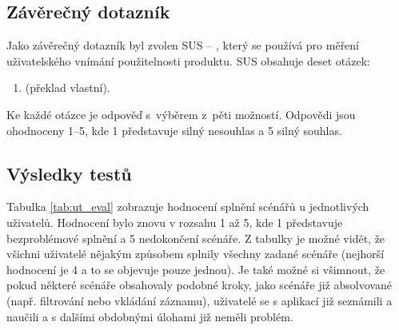 \documentclass[thesis=M,czech]{FITthesis}[2012/06/26]
\begin{document}
\subsection{Závěrečný dotazník}
Jako závěrečný dotazník byl zvolen SUS -- , který se používá pro měření uživatelského vnímání použitelnosti produktu. SUS obsahuje deset otázek:
\begin{enumerate}
 \item {} (překlad vlastní).
\end{enumerate}
Ke každé otázce je odpověď s~výběrem z~pěti možností. Odpovědi jsou ohodnoceny 1--5, kde 1 představuje silný nesouhlas a 5 silný souhlas. \cite{sus}

\subsection{Výsledky testů}
Tabulka \ref{tab:ut_eval} zobrazuje hodnocení splnění scénářů u jednotlivých uživatelů. Hodnocení bylo znovu v rozsahu 1 až 5, kde 1 představuje bezproblémové splnění a 5 nedokončení scénáře.  Z tabulky je možné vidět, že všichni uživatelé nějakým způsobem splnily všechny zadané scénáře (nejhorší hodnocení je 4 a to se objevuje pouze jednou). Je také možné si všimnout, že pokud některé scénáře obsahovaly podobné kroky, jako scénáře již absolvované (např. filtrování nebo vkládání záznamu), uživatelé se s aplikací již seznámili a naučili a s dalšími obdobnými úlohami již neměli problém.
\end{document}

